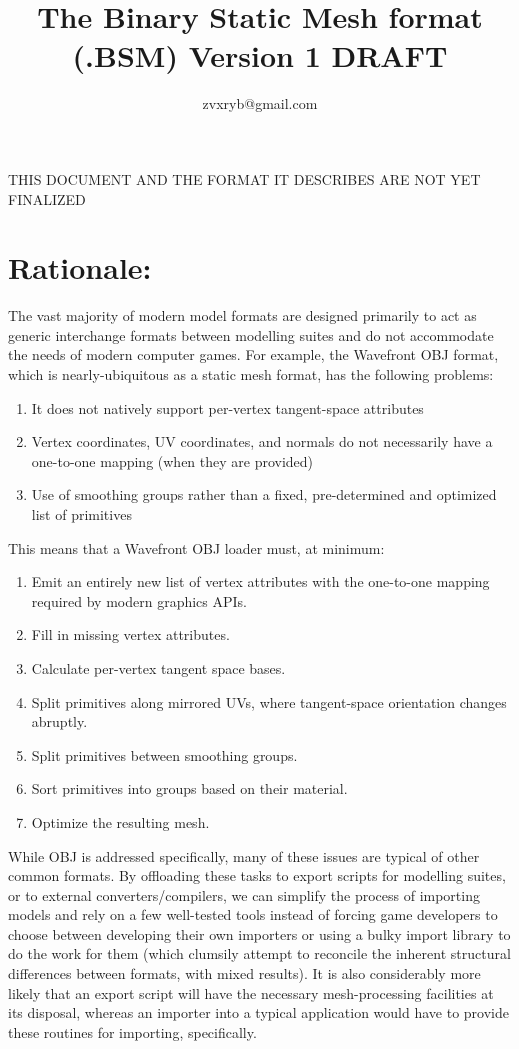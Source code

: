 \documentclass{article}
\title{The Binary Static Mesh format (.BSM) Version 1 DRAFT}
\author{zvxryb@gmail.com}
\begin{document}
\maketitle
\begin{center}
	THIS DOCUMENT AND THE FORMAT IT DESCRIBES ARE NOT YET FINALIZED
\end{center}

\section{Rationale:}

The vast majority of modern model formats are designed primarily to act as generic interchange formats between modelling suites and do not accommodate the needs of modern computer games.  For example, the Wavefront OBJ format, which is nearly-ubiquitous as a static mesh format, has the following problems:
\begin{enumerate}
	\item It does not natively support per-vertex tangent-space attributes
	\item Vertex coordinates, UV coordinates, and normals do not necessarily have a one-to-one mapping (when they are provided)
	\item Use of smoothing groups rather than a fixed, pre-determined and optimized list of primitives
\end{enumerate}
This means that a Wavefront OBJ loader must, at minimum:
\begin{enumerate}
	\item Emit an entirely new list of vertex attributes with the one-to-one mapping required by modern graphics APIs.
	\item Fill in missing vertex attributes.
	\item Calculate per-vertex tangent space bases.
	\item Split primitives along mirrored UVs, where tangent-space orientation changes abruptly.
	\item Split primitives between smoothing groups.
	\item Sort primitives into groups based on their material.
	\item Optimize the resulting mesh.
\end{enumerate}

While OBJ is addressed specifically, many of these issues are typical of other common formats.  By offloading these tasks to export scripts for modelling suites, or to external converters/compilers, we can simplify the process of importing models and rely on a few well-tested tools instead of forcing game developers to choose between developing their own importers or using a bulky import library to do the work for them (which clumsily attempt to reconcile the inherent structural differences between formats, with mixed results).  It is also considerably more likely that an export script will have the necessary mesh-processing facilities at its disposal, whereas an importer into a typical application would have to provide these routines for importing, specifically.
\end{document}
